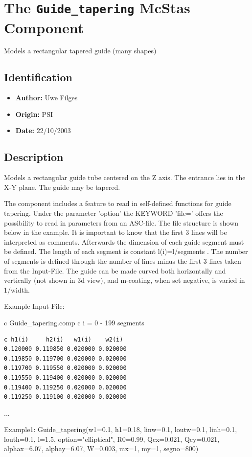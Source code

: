 \section{The \texttt{Guide\_tapering} McStas Component}
Models a rectangular tapered guide (many shapes)

\subsection*{Identification}
\begin{itemize}
  \item \textbf{Author:} Uwe Filges
  \item \textbf{Origin:} PSI
  \item \textbf{Date:} 22/10/2003
\end{itemize}

\subsection*{Description}
Models a rectangular guide tube centered on the Z axis. The entrance lies in the X-Y plane. The guide may be tapered.

The component includes a feature to read in self-defined functions for guide tapering. Under the parameter 'option' the KEYWORD 'file=' offers the possibility to read in parameters from an ASC-file. The file structure is shown below in the example. It is important to know that the first 3 lines will be interpreted as comments. Afterwards the dimension of each guide segment must be defined. The length of each segment is constant l(i)=l/segments . The number of segments is defined through the number of lines minus the first 3 lines taken from the Input-File. The guide can be made curved both horizontally and vertically (not shown in 3d view), and m-coating, when set negative, is varied in 1/width.

Example Input-File:

c Guide\_tapering.comp c i = 0 - 199 segments

\begin{verbatim}
c h1(i)     h2(i)   w1(i)    w2(i)
0.120000 0.119850 0.020000 0.020000
0.119850 0.119700 0.020000 0.020000
0.119700 0.119550 0.020000 0.020000
0.119550 0.119400 0.020000 0.020000
0.119400 0.119250 0.020000 0.020000
0.119250 0.119100 0.020000 0.020000
\end{verbatim}

...

Example1: Guide\_tapering(w1=0.1, h1=0.18, linw=0.1, loutw=0.1, linh=0.1, louth=0.1, l=1.5, option="elliptical", R0=0.99, Qcx=0.021, Qcy=0.021, alphax=6.07, alphay=6.07, W=0.003, mx=1, my=1, segno=800)

